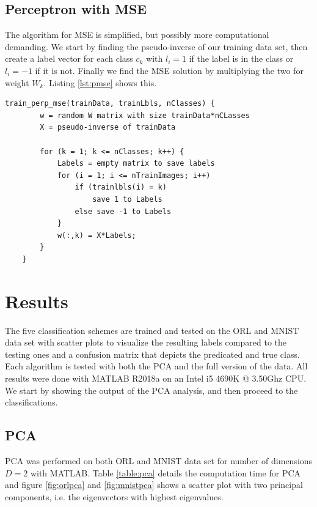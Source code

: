 \documentclass[journal]{IEEEtran}
\begin{document}
\subsection{Perceptron with MSE} 

The algorithm for MSE is simplified, but possibly more computational demanding. We start by finding the pseudo-inverse of our training data set, then create a label vector for each class $c_{k}$ with $l_{i} = 1$ if the label is in the class or $l_{i} = -1$ if it is not. Finally we find the MSE solution by multiplying the two for weight $W_{k}$. Listing \ref{lst:pmse} shows this.

\begin{minipage}[H]{0.95\linewidth}
	\begin{lstlisting}[caption=Implementation of NSC., label={lst:pmse}]
	train_perp_mse(trainData, trainLbls, nClasses) {
		w = random W matrix with size trainData*nCLasses
		X = pseudo-inverse of trainData
		
		for (k = 1; k <= nClasses; k++) {
			Labels = empty matrix to save labels
			for (i = 1; i <= nTrainImages; i++)
				if (trainlbls(i) = k)
					save 1 to Labels
				else save -1 to Labels
			}
			w(:,k) = X*Labels;
		}
	}
	\end{lstlisting}
\end{minipage}

\section{Results}

The five classification schemes are trained and tested on the ORL and MNIST data set with scatter plots to visualize the resulting labels compared to the testing ones and a confusion matrix that depicts the predicated and true class. Each algorithm is tested with both the PCA and the full version of the data. All results were done with MATLAB R2018a on an Intel i5 4690K @ 3.50Ghz CPU. We start by showing the output of the PCA analysis, and then proceed to the classifications.

\subsection{PCA}

PCA was performed on both ORL and MNIST data set for number of dimensions $D=2$ with MATLAB. Table \ref{table:pca} details the computation time for PCA and figure \ref{fig:orlpca} and \ref{fig:mnistpca} shows a scatter plot with two principal components, i.e. the eigenvectors with highest eigenvalues.
\end{document}
